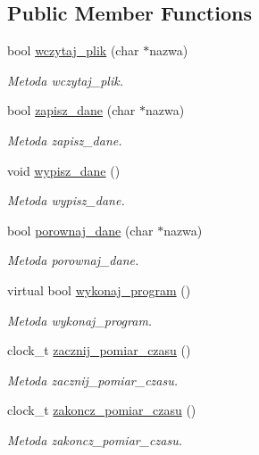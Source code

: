 \subsection*{Public Member Functions}
\begin{DoxyCompactItemize}
\item 
bool \hyperlink{class_program_a7278c6a0f493496979edc7b76fb7f368}{wczytaj\-\_\-plik} (char $\ast$nazwa)
\begin{DoxyCompactList}\small\item\em Metoda wczytaj\-\_\-plik. \end{DoxyCompactList}\item 
bool \hyperlink{class_program_aaef7fcaf64830eb231cbb9e887d705af}{zapisz\-\_\-dane} (char $\ast$nazwa)
\begin{DoxyCompactList}\small\item\em Metoda zapisz\-\_\-dane. \end{DoxyCompactList}\item 
void \hyperlink{class_program_a060ea3afebf696152d50135d20856e5a}{wypisz\-\_\-dane} ()
\begin{DoxyCompactList}\small\item\em Metoda wypisz\-\_\-dane. \end{DoxyCompactList}\item 
bool \hyperlink{class_program_ab5441e0e8ecd02ffeada4d77aaad2726}{porownaj\-\_\-dane} (char $\ast$nazwa)
\begin{DoxyCompactList}\small\item\em Metoda porownaj\-\_\-dane. \end{DoxyCompactList}\item 
virtual bool \hyperlink{class_program_ac396401ba5cade863d0e6acb727bec4e}{wykonaj\-\_\-program} ()
\begin{DoxyCompactList}\small\item\em Metoda wykonaj\-\_\-program. \end{DoxyCompactList}\item 
clock\-\_\-t \hyperlink{class_program_ab68c69977637eb8cc05a57e176a21986}{zacznij\-\_\-pomiar\-\_\-czasu} ()
\begin{DoxyCompactList}\small\item\em Metoda zacznij\-\_\-pomiar\-\_\-czasu. \end{DoxyCompactList}\item 
clock\-\_\-t \hyperlink{class_program_a3515568f8df7224bfd8fd8b7b76ab0ba}{zakoncz\-\_\-pomiar\-\_\-czasu} ()
\begin{DoxyCompactList}\small\item\em Metoda zakoncz\-\_\-pomiar\-\_\-czasu. \end{DoxyCompactList}\end{DoxyCompactItemize}
